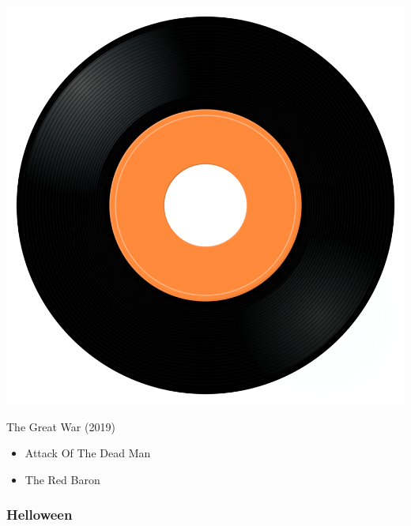 \begin{minipage}[t]{0.25\textwidth}\vspace{0pt}
\captionsetup{type=figure}
\includegraphics[width=\textwidth]{Images/cover.png}
\caption*{The Great War (2019)}
\end{minipage}
\begin{minipage}[t]{0.25\textwidth}\vspace{0pt}
\begin{itemize}[nosep,leftmargin=1em,labelwidth=*,align=left]
	\setlength{\itemsep}{0pt}
	\item Attack Of The Dead Man
	\item The Red Baron
\end{itemize}
\end{minipage}



\subsubsection{Helloween}

